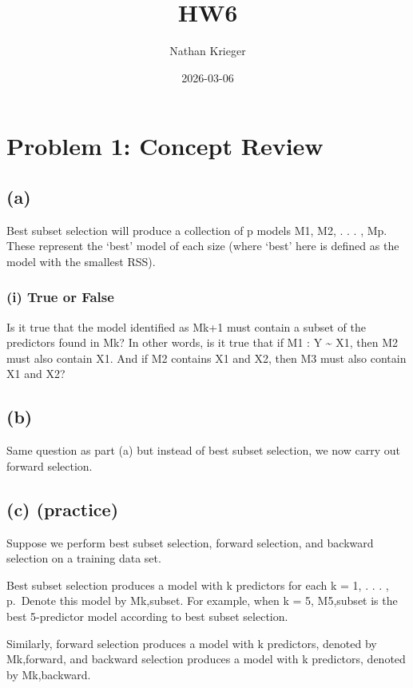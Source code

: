 \documentclass[
]{article}
\title{HW6}
\author{Nathan Krieger}
\date{2026-03-06}
\begin{document}
\maketitle

\section{Problem 1: Concept Review}\label{problem-1-concept-review}

\subsection{(a)}\label{a}

Best subset selection will produce a collection of p models M1, M2, . .
. , Mp. These represent the `best' model of each size (where `best' here
is defined as the model with the smallest RSS).

\subsubsection{(i) True or False}\label{i-true-or-false}

Is it true that the model identified as Mk+1 must contain a subset of
the predictors found in Mk? In other words, is it true that if M1 : Y
\textasciitilde{} X1, then M2 must also contain X1. And if M2 contains
X1 and X2, then M3 must also contain X1 and X2?

\subsection{(b)}\label{b}

Same question as part (a) but instead of best subset selection, we now
carry out forward selection.

\subsection{(c) (practice)}\label{c-practice}

Suppose we perform best subset selection, forward selection, and
backward selection on a training data set.

Best subset selection produces a model with k predictors for each k = 1,
. . . , p.~Denote this model by Mk,subset. For example, when k = 5,
M5,subset is the best 5-predictor model according to best subset
selection.

Similarly, forward selection produces a model with k predictors, denoted
by Mk,forward, and backward selection produces a model with k
predictors, denoted by Mk,backward.
\end{document}
